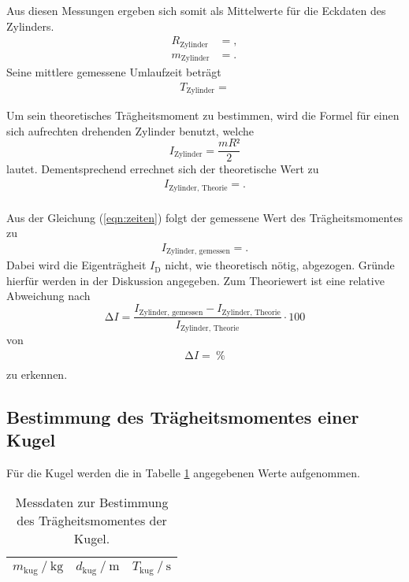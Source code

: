 Aus diesen Messungen ergeben sich somit als Mittelwerte für die Eckdaten des Zylinders.
\begin{align*}
  R_{\text{Zylinder}} &= , \\
  m_{\text{Zylinder}} &= .
\end{align*}
Seine mittlere gemessene Umlaufzeit beträgt
\begin{align*}
  T_{\text{Zylinder}} = 
\end{align*}

Um sein theoretisches Trägheitsmoment zu bestimmen, wird die Formel für einen sich aufrechten drehenden Zylinder benutzt, welche
\begin{equation}
  I_{\text{Zylinder}} = \frac{mR²}{2}
\end{equation}
lautet.
Dementsprechend errechnet sich der theoretische Wert zu
\begin{align*}
  I_{\text{Zylinder, Theorie}} = . \\
\end{align*}

Aus der Gleichung (\ref{eqn:zeiten}) folgt der gemessene Wert des Trägheitsmomentes zu
\begin{align*}
  I_{\text{Zylinder, gemessen}} = .
\end{align*}
Dabei wird die Eigenträgheit $I_\text{D}$ nicht, wie theoretisch nötig, abgezogen.
Gründe hierfür werden in der Diskussion angegeben.
Zum Theoriewert ist eine relative Abweichung nach
\begin{equation}
  \increment I = \frac{I_{\text{Zylinder, gemessen}} - I_{\text{Zylinder, Theorie}}}{I_{\text{Zylinder, Theorie}}} \cdot 100
\end{equation}
von
\begin{align*}
  \increment I =  \:\si{\percent} \\
\end{align*}
zu erkennen.


\subsection{Bestimmung des Trägheitsmomentes einer Kugel}
Für die Kugel werden die in Tabelle \ref{tab:kug} angegebenen Werte aufgenommen.

\begin{table}[H]
  \centering
  \caption{Messdaten zur Bestimmung des Trägheitsmomentes der Kugel.}
  \label{tab:kug}
  \begin{tabular}{c c c}
    \toprule
    {$m_\text{kug} \ /\ \si{\kilo\gram}$} & {$d_\text{kug} \ /\ \si{\metre}$} & {$T_\text{kug} \ /\ \si{\second}$}\\
    \midrule
    
    \bottomrule
  \end{tabular}
\end{table}


